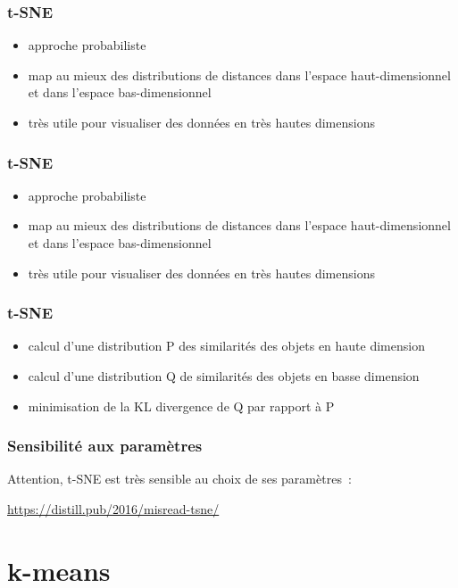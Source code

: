 \documentclass{formation}
\begin{document}
\begin{frame}
  \frametitle{t-SNE}

  \begin{itemize}
  \item approche probabiliste
  \item map au mieux des distributions de distances dans l'espace
    haut-dimensionnel et dans l'espace bas-dimensionnel
  \item très utile pour visualiser des données en très hautes
    dimensions
  \end{itemize}
\end{frame}

\begin{frame}
  \frametitle{t-SNE}

  \begin{itemize}
  \item approche probabiliste
  \item map au mieux des distributions de distances dans l'espace
    haut-dimensionnel et dans l'espace bas-dimensionnel
  \item très utile pour visualiser des données en très hautes
    dimensions
  \end{itemize}
\end{frame}

\begin{frame}
  \frametitle{t-SNE}

  \begin{itemize}
  \item calcul d'une distribution P des similarités des objets en
    haute dimension
  \item calcul d'une distribution Q de similarités des objets en basse
    dimension
  \item minimisation de la KL divergence de Q par rapport à P
  \end{itemize}
\end{frame}


\begin{frame}
  \frametitle{Sensibilité aux paramètres}

  Attention, t-SNE est très sensible au choix de ses paramètres :

  \url{https://distill.pub/2016/misread-tsne/}
\end{frame}

\section{k-means}
\end{document}
